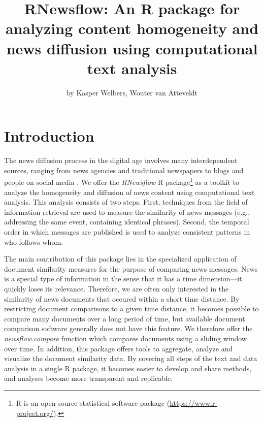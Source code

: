 \title{RNewsflow: An R package for analyzing content homogeneity and news
diffusion using computational text analysis}
\author{by Kasper Welbers, Wouter van Atteveldt}

\maketitle


\section{Introduction}

The news diffusion process in the digital age involves many
interdependent sources, ranging from news agencies and traditional
newspapers to blogs and people on social media
\citep{meraz11, paterson05, pew10}. We offer the \emph{RNewsflow} R
package\footnote{R is an open-source statistical software package
  (\url{https://www.r-project.org/}).} as a toolkit to analyze the
homogeneity and diffusion of news content using computational text
analysis. This analysis consists of two steps. First, techniques from
the field of information retrieval are used to measure the similarity of
news messages (e.g., addressing the same event, containing identical
phrases). Second, the temporal order in which messages are published is
used to analyze consistent patterns in who follows whom.

The main contribution of this package lies in the specialized
application of document similarity measures for the purpose of comparing
news messages. News is a special type of information in the sense that
it has a time dimension---it quickly loses its relevance. Therefore, we
are often only interested in the similarity of news documents that
occured within a short time distance. By restricting document
comparisons to a given time distance, it becomes possible to compare
many documents over a long period of time, but available document
comparison software generally does not have this feature. We therefore
offer the \emph{newsflow.compare} function which compares documents
using a sliding window over time. In addition, this package offers tools
to aggregate, analyze and visualize the document similarity data. By
covering all steps of the text and data analysis in a single R package,
it becomes easier to develop and share methods, and analyses become more
transparent and replicable.

